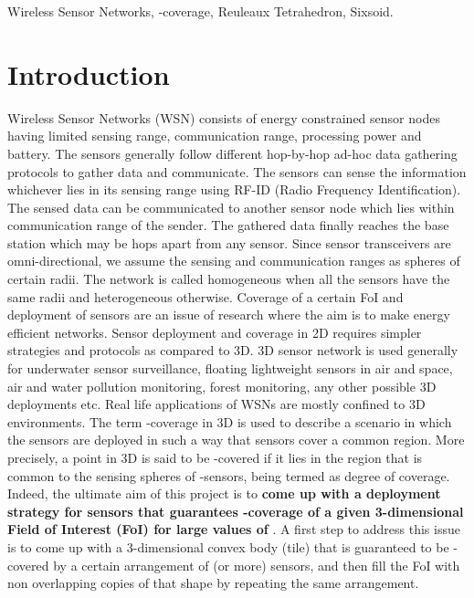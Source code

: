 \documentclass[conference]{IEEEtran}
\begin{document}
\begin{IEEEkeywords}
Wireless Sensor Networks, -coverage, Reuleaux Tetrahedron, Sixsoid.
\end{IEEEkeywords}


\IEEEpeerreviewmaketitle


\section{Introduction}
Wireless Sensor Networks (WSN) consists of energy constrained sensor nodes having limited sensing range, communication range, processing power and battery. The sensors generally follow different hop-by-hop ad-hoc data gathering protocols to gather data and communicate. The sensors can sense the information whichever lies in its sensing range using RF-ID (Radio Frequency Identification). The sensed data can be communicated to another sensor node which lies within communication range of the sender. 
The gathered data finally reaches the base station which may be hops apart from any sensor. Since sensor transceivers are omni-directional, we assume the sensing and communication ranges as spheres of certain radii. The network is called homogeneous when all the sensors have the same radii and heterogeneous otherwise. Coverage of a certain FoI and deployment of sensors are an issue of research where the aim is to make energy efficient networks. Sensor deployment and coverage in 2D requires simpler strategies and protocols as compared to 3D. 3D sensor network is used generally for underwater sensor surveillance, floating lightweight sensors in air and space, air and water pollution monitoring, forest monitoring, any other possible 3D deployments etc. Real life applications of WSNs are mostly confined to 3D environments. The term -coverage in 3D is used to describe a scenario in which the sensors are deployed in such a way that  sensors cover a common region. More precisely, a point in 3D is said to be -covered if it lies in the region that is common to the sensing spheres of -sensors,  being termed as degree of coverage. Indeed, the ultimate aim of this project is to \textbf{come up with a deployment strategy for sensors that guarantees -coverage of a given 3-dimensional Field of Interest (FoI) for large values of }. A first step to address this issue is to come up with a 3-dimensional convex body (tile) that is guaranteed to be -covered by a certain arrangement of  (or more) sensors, and then fill the FoI with non overlapping copies of that shape by repeating the same arrangement.
\end{document}
